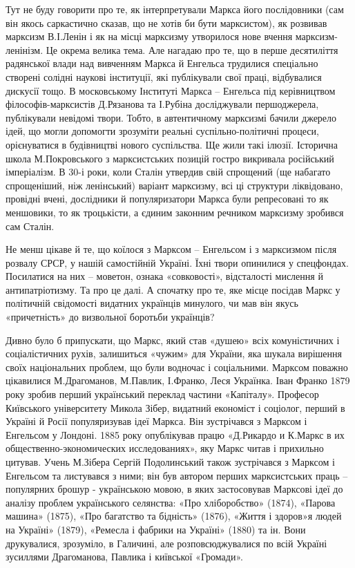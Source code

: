 \documentclass{kapital}
\begin{document}
	Тут не буду говорити про те, як  інтерпретували Маркса його послідовники (сам він якось саркастично сказав, що не хотів би бути марксистом), як розвивав марксизм В.І.Ленін і як на місці марксизму утворилося нове вчення марксизм-ленінізм. Це окрема велика тема. Але нагадаю про те, що в перше десятиліття радянської влади над вивченням Маркса й Енгельса трудилися спеціально створені солідні наукові інституції, які публікували свої праці, відбувалися дискусії тощо. В московському  Інституті Маркса – Енгельса під керівництвом філософів-марксистів Д.Рязанова та І.Рубіна  досліджували першоджерела, публікували невідомі твори. Тобто, в автентичному марксизмі бачили джерело ідей, що могли допомогти зрозуміти реальні суспільно-політичні процеси, орієнуватися в будівництві нового суспільства. Ще жили такі ілюзії. Історична школа М.Покровського з марксистських  позицій гостро викривала російський імперіалізм. В 30-і роки, коли Сталін утвердив свій спрощений (ще набагато спрощеніший, ніж ленінський) варіант марксизму, всі ці структури ліквідовано, провідні вчені, дослідники й популяризатори Маркса були репресовані то як меншовики, то як троцькісти, а єдиним законним речником марксизму зробився сам Сталін.
 
	Не менш цікаве й те, що коїлося з Марксом – Енгельсом і з марксизмом після розвалу СРСР, у нашій самостійній Україні. Їхні твори опинилися у спецфондах. Посилатися на них – моветон, ознака «совковості», відсталості мислення й антипатріотизму. Та про це далі. А спочатку про те, яке місце посідав Маркс у політичній свідомості видатних українців минулого, чи мав він якусь «причетність» до визвольної боротьби українців?           
 
	Дивно було б припускати, що Маркс, який став «душею» всіх комуністичних і соціалістичних рухів, залишиться «чужим» для України, яка шукала вирішення своїх національних проблем, що були водночас і соціальними. Марксом поважно цікавилися  М.Драгоманов, М.Павлик, І.Франко, Леся Українка. Іван Франко 1879 року зробив перший український переклад частини «Капіталу». Професор Київського університету Микола Зібер, видатний економіст і соціолог, перший в Україні й Росії популяризував ідеї Маркса. Він зустрічався з Марксом і Енгельсом у Лондоні.  1885 року опублікував працю «Д.Рикардо и К.Маркс в их общественно-экономических исследованиях», яку Маркс читав і прихильно цитував. Учень М.Зібера Сергій Подолинський також зустрічався з Марксом і Енгельсом та листувався з ними; він був автором перших марксистських праць – популярних брошур - українською мовою, в яких застосовував Марксові ідеї до аналізу проблем українського селянства: «Про хліборобство» (1874), «Парова машина» (1875), «Про багатство та бідність» (1876), «Життя і здоров»я людей на Україні» (1879), «Ремесла і фабрики на Україні» (1880) та ін. Вони друкувалися, зрозуміло, в Галичині, але розповсюджувалися по всій Україні зусиллями Драгоманова, Павлика і київської  «Громади». 
 
\end{document}
